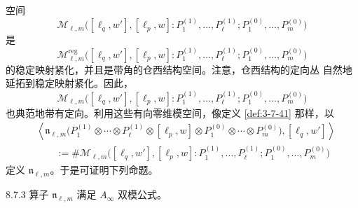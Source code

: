 空间
\[
 \mathcal M_{\ell,m}
 \bigl([\ell_q,w'],[\ell_p,w]:
 P_1^{(1)},\ldots,P_\ell^{(1)};
 P_1^{(0)},\ldots,P_m^{(0)}\bigr)
\]
是
\[
 \mathcal M^{\mathrm{reg}}_{\ell,m}
 \bigl([\ell_q,w'],[\ell_p,w]:
 P_1^{(1)},\ldots,P_\ell^{(1)};
 P_1^{(0)},\ldots,P_m^{(0)}\bigr)
\]
的稳定映射紧化，并且是带角的仓西结构空间。注意，仓西结构的定向丛
自然地延拓到稳定映射紧化。因此，
\[
 \mathcal M_{\ell,m}
 \bigl([\ell_q,w'],[\ell_p,w]:
 P_1^{(1)},\ldots,P_\ell^{(1)};
 P_1^{(0)},\ldots,P_m^{(0)}\bigr)
\]
也典范地带有定向。利用这些有向零维模空间，像定义
\ref{def:3-7-41} 那样，以
\[
\begin{aligned}
 &\left\langle
 \mathfrak n_{\ell,m}
 \bigl(P_1^{(1)}\otimes\cdots\otimes P_\ell^{(1)}
 \otimes[\ell_p,w]\otimes
 P_1^{(0)}\otimes\cdots\otimes P_m^{(0)}\bigr),
 [\ell_q,w']\right\rangle\\
 &\qquad:=\#\mathcal M_{\ell,m}
 \bigl([\ell_q,w'],[\ell_p,w]:
 P_1^{(1)},\ldots,P_\ell^{(1)};
 P_1^{(0)},\ldots,P_m^{(0)}\bigr)
\end{aligned}
\]
定义 $\mathfrak n_{\ell,m}$。于是可证明下列命题。

\begin{proposition}{8.7.3}\label{prop:8-7-3}
算子 $\mathfrak n_{\ell,m}$ 满足 $A_\infty$ 双模公式。
\end{proposition}

